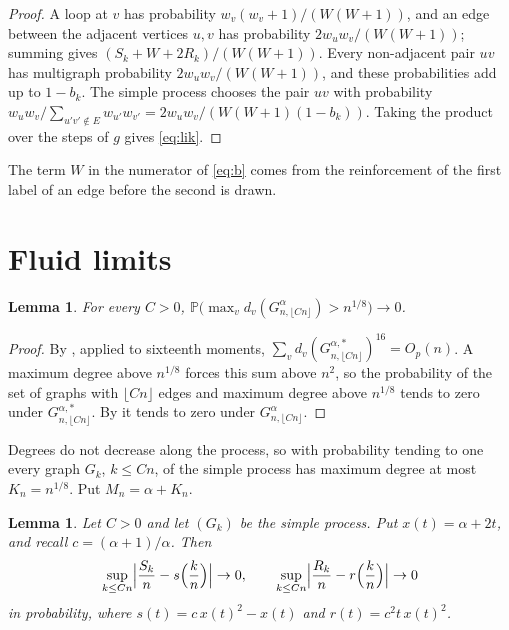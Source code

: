 \documentclass[11pt]{amsart}
\newtheorem{lemma}[theorem]{Lemma}
\theoremstyle{remark}
\numberwithin{equation}{section}
\newcommand{\PP}{\mathbb{P}}
\begin{document}
\begin{proof}
A loop at $v$ has probability $w_v(w_v+1)/(W(W+1))$, and an edge between the adjacent vertices $u,v$ has probability $2w_uw_v/(W(W+1))$; summing gives $(S_k+W+2R_k)/(W(W+1))$. Every non-adjacent pair $uv$ has multigraph probability $2w_uw_v/(W(W+1))$, and these probabilities add up to $1-b_k$. The simple process chooses the pair $uv$ with probability $w_uw_v/\sum_{u'v'\notin E}w_{u'}w_{v'}=2w_uw_v/(W(W+1)(1-b_k))$. Taking the product over the steps of $g$ gives \eqref{eq:lik}.
\end{proof}

The term $W$ in the numerator of \eqref{eq:b} comes from the reinforcement of the first label of an edge before the second is drawn.

\section{Fluid limits}\label{sec:fluid}

\begin{lemma}\label{lem:deg}
For every $C>0$, $\PP\bigl(\max_v d_v(G^\alpha_{n,\lfloor Cn\rfloor})>n^{1/8}\bigr)\to0$.
\end{lemma}

\begin{proof}
By \cite[Theorem~2.5]{JW21}, applied to sixteenth moments, $\sum_vd_v(G^{\alpha,*}_{n,\lfloor Cn\rfloor})^{16}=O_p(n)$. A maximum degree above $n^{1/8}$ forces this sum above $n^2$, so the probability of the set of graphs with $\lfloor Cn\rfloor$ edges and maximum degree above $n^{1/8}$ tends to zero under $G^{\alpha,*}_{n,\lfloor Cn\rfloor}$. By \cite[Theorem~2.2]{JW21} it tends to zero under $G^{\alpha}_{n,\lfloor Cn\rfloor}$.
\end{proof}

Degrees do not decrease along the process, so with probability tending to one every graph $G_k$, $k\le Cn$, of the simple process has maximum degree at most $K_n=n^{1/8}$. Put $M_n=\alpha+K_n$.

\begin{lemma}\label{lem:fluid}
Let $C>0$ and let $(G_k)$ be the simple process. Put $x(t)=\alpha+2t$, and recall $c=(\alpha+1)/\alpha$. Then
\[
\sup_{k\le Cn}\Bigl|\frac{S_k}{n}-s\Bigl(\frac kn\Bigr)\Bigr|\to0,\qquad \sup_{k\le Cn}\Bigl|\frac{R_k}{n}-r\Bigl(\frac kn\Bigr)\Bigr|\to0
\]
in probability, where $s(t)=c\,x(t)^2-x(t)$ and $r(t)=c^2t\,x(t)^2$.
\end{lemma}
\end{document}
